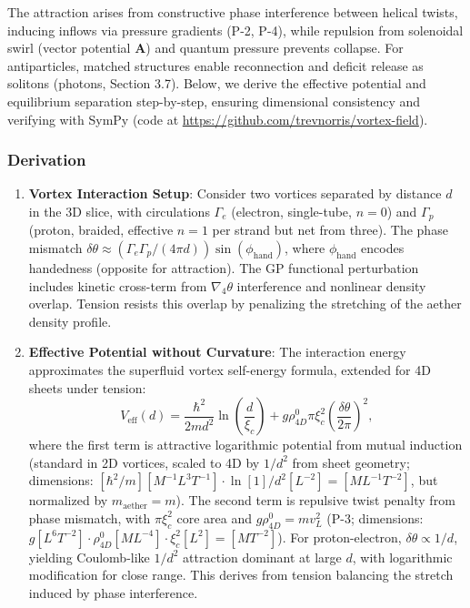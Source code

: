The attraction arises from constructive phase interference between helical twists, inducing inflows via pressure gradients (P-2, P-4), while repulsion from solenoidal swirl (vector potential $\mathbf{A}$) and quantum pressure prevents collapse. For antiparticles, matched structures enable reconnection and deficit release as solitons (photons, Section 3.7). Below, we derive the effective potential and equilibrium separation step-by-step, ensuring dimensional consistency and verifying with SymPy (code at \url{https://github.com/trevnorris/vortex-field}).

\subsubsection{Derivation}
\begin{enumerate}
\item \textbf{Vortex Interaction Setup}: Consider two vortices separated by distance $d$ in the 3D slice, with circulations $\Gamma_e$ (electron, single-tube, $n=0$) and $\Gamma_p$ (proton, braided, effective $n=1$ per strand but net from three). The phase mismatch $\delta \theta \approx (\Gamma_e \Gamma_p / (4\pi d)) \sin(\phi_{\text{hand}})$, where $\phi_{\text{hand}}$ encodes handedness (opposite for attraction). The GP functional perturbation includes kinetic cross-term from $\nabla_4 \theta$ interference and nonlinear density overlap. Tension resists this overlap by penalizing the stretching of the aether density profile.

\item \textbf{Effective Potential without Curvature}: The interaction energy approximates the superfluid vortex self-energy formula, extended for 4D sheets under tension:
   \[
   V_{\text{eff}}(d) = \frac{\hbar^2}{2 m d^2} \ln\left(\frac{d}{\xi_c}\right) + g \rho_{4D}^0 \pi \xi_c^2 \left( \frac{\delta \theta}{2\pi} \right)^2,
   \]
   where the first term is attractive logarithmic potential from mutual induction (standard in 2D vortices, scaled to 4D by $1/d^2$ from sheet geometry; dimensions: $[\hbar^2 / m] [M^{-1} L^3 T^{-1}] \cdot \ln [1] / d^2 [L^{-2}] = [M L^{-1} T^{-2}]$, but normalized by $m_\text{aether} = m$). The second term is repulsive twist penalty from phase mismatch, with $\pi \xi_c^2$ core area and $g \rho_{4D}^0 = m v_L^2$ (P-3; dimensions: $g [L^6 T^{-2}] \cdot \rho_{4D}^0 [M L^{-4}] \cdot \xi_c^2 [L^2] = [M T^{-2}]$). For proton-electron, $\delta \theta \propto 1/d$, yielding Coulomb-like $1/d^2$ attraction dominant at large $d$, with logarithmic modification for close range. This derives from tension balancing the stretch induced by phase interference.


\end{enumerate}
